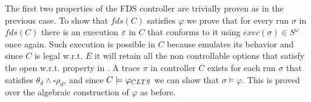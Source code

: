The first two properties of the FDS controller are trivially proven as in the previous case. To show that $fds(C)$ satisfies $\varphi$  we prove that for every run $\sigma$ in $fds(C)$ there is an execution $\varepsilon$ in $C$ that conforms to it using $exec(\sigma) \in S^{\omega}$ once again. Such execution is possible in $C$ because \fdsD emulates its behavior and since $C$ is legal w.r.t. $E$ it will retain all the non controllable options that satisfy the open w.r.t. \gsX property in \fdsD.
A trace $\pi$ in controller $C$ exists for each run $\sigma$ that satisfies $\theta_d \wedge \square \rho_d$, and since $C \models \varphi_{CLTS}$ we can show that $\sigma \models \varphi$. This is proved over the algebraic construction of $\varphi$ as before.

